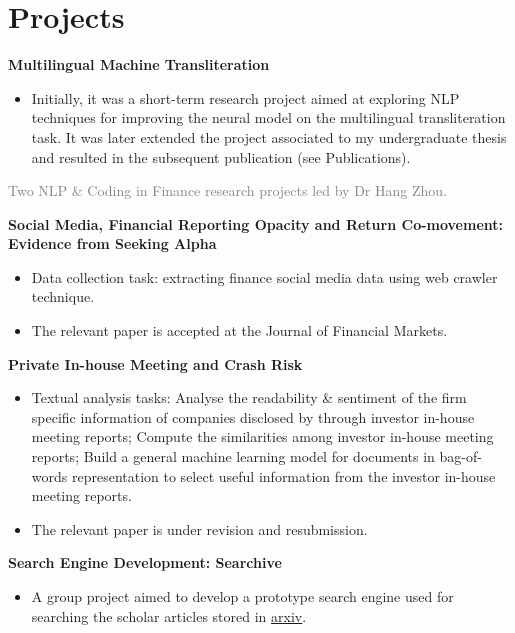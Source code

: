\documentclass[%
               doublesided,
               paper=a4,
               fontsize=11pt
              ]{my-resume}
\begin{document}
\section[\faFolder]{Projects}

\textbf{Multilingual Machine Transliteration}
\smallskip
\begin{itemize}
\item Initially, it was a short-term research project aimed at exploring NLP techniques for improving the neural model on the multilingual transliteration task. It was later extended the project associated to my undergraduate thesis and resulted in the subsequent publication (see Publications).
\end{itemize}
\divider

\textcolor{gray}{Two NLP \& Coding in Finance research projects led by Dr Hang Zhou.}
\smallskip

\textbf{Social Media, Financial Reporting Opacity and Return Co-movement: Evidence from Seeking Alpha}
\smallskip
\begin{itemize}
    \item Data collection task: extracting finance social media data using web crawler technique.
    \item The relevant paper is accepted at the Journal of Financial Markets.
\end{itemize}
\smallskip

\textbf{Private In-house Meeting and Crash Risk}
\begin{itemize}
    \item Textual analysis tasks:  Analyse the readability \& sentiment of the firm specific information of companies disclosed by through investor in-house meeting reports; 
     Compute the similarities among investor in-house meeting reports;
     Build a general machine learning model for documents in bag-of-words representation to select useful information from the investor in-house meeting reports.
    \item The relevant paper is under revision and resubmission.
\end{itemize}
\divider

\textbf{Search Engine Development: Searchive}
\smallskip
\begin{itemize}
    \item A group project aimed to develop a prototype search engine used for searching the scholar articles stored in \href{https://arxiv.org/}{arxiv}. 
\end{itemize}
\divider
\end{document}
